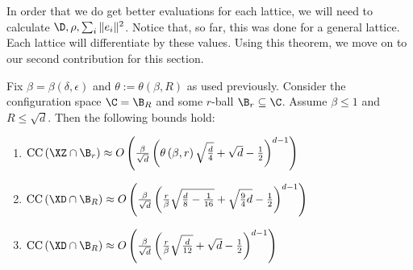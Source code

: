 In order that we do get better evaluations for each lattice, we will need to calculate $\D, \rho, \sum_i \|e_i\|^2$. Notice that, so far, this was done for a general lattice. Each lattice will differentiate by these values.
Using this theorem, we move on to our second contribution for this section.
\begin{thm}\label{collision_complexity_results}
    Fix $\beta=\beta\left(\delta,\epsilon\right)$ and $\theta:=\theta\left(\beta,R\right)$ as used previously. Consider the configuration space  $\C=\B_R$ and some $r$-ball $\B_r\subseteq\C$. Assume $\beta\leq1$ and $R\leq\sqrt{d}$. Then the following bounds hold:
    \begin{enumerate}[topsep=1pt,itemsep=1ex,partopsep=1ex,parsep=1ex]
        \item 
            $\text{CC}\left(\XZ\cap\B_r\right) \approx O\left(\frac{\beta}{\sqrt{d}}\left(\theta\left(\beta,r\right)\sqrt{\frac{d}{4}}+\sqrt{d}-\frac{1}{2}\right)^{d-1}\right)$
        \item 
            $\text{CC}\left(\XD\cap\B_R\right) \approx O\left(\frac{\beta}{\sqrt{d}}\left(\frac{r}{\beta}\sqrt{\frac{d}{8}-\frac{1}{16}}+\sqrt{\frac{9}{4}d}-\frac{1}{2}\right)^{d-1}\right)$
        \item 
            $\text{CC}\left(\XD\cap\B_R\right) \approx O\left(\frac{\beta}{\sqrt{d}}\left(\frac{r}{\beta}\sqrt{\frac{d}{12}}+\sqrt{d}-\frac{1}{2}\right)^{d-1}\right)$
    \end{enumerate}
\end{thm}
